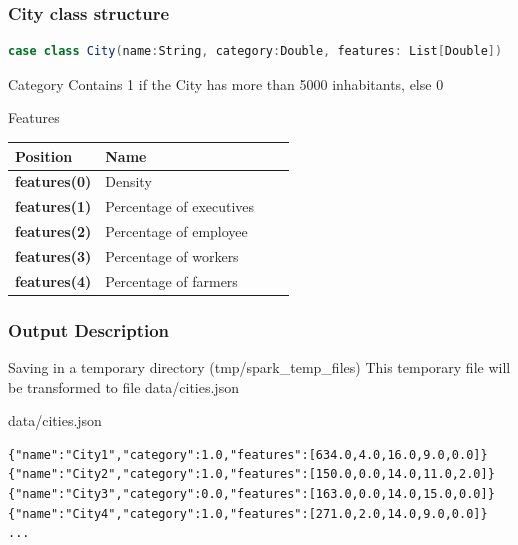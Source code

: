 \documentclass[slidetop,9pt,utf8]{beamer}
\begin{document}
\begin{CJK}{UTF8}{gbsn}
\begin{frame}[fragile]
  \frametitle{City class structure}

  \begin{lstlisting}[label=CityClassOverview, caption=psug.hands.on.exercise05.City class overview, language=scala, style=code]
case class City(name:String, category:Double, features: List[Double])
  \end{lstlisting}

  \begin{block}{Category}
    Contains 1 if the City has more than 5000 inhabitants, else 0
  \end{block}

  \begin{block}{Features}
    \begin{center}
      \begin{tabular}{|l|l|l|l|}
            \hline 
            \rowcolor{gray} \textbf{Position} & \textbf{Name} \\ \hline
            \textbf{features(0)} & Density \\ \hline
            \textbf{features(1)} & Percentage of executives \\ \hline
            \textbf{features(2)} & Percentage of employee \\ \hline
            \textbf{features(3)} & Percentage of workers \\ \hline
            \textbf{features(4)} & Percentage of farmers \\ \hline
      \end{tabular}
    \end{center}
  \end{block}

\end{frame}

\begin{frame}[fragile]

  \frametitle{Output Description}
  
  \begin{block}{Saving in a temporary directory (tmp/spark\_temp\_files)}
    This temporary file will be transformed to file data/cities.json
  \end{block}


  \begin{block}{data/cities.json}
    \begin{verbatim}
{"name":"City1","category":1.0,"features":[634.0,4.0,16.0,9.0,0.0]}
{"name":"City2","category":1.0,"features":[150.0,0.0,14.0,11.0,2.0]}
{"name":"City3","category":0.0,"features":[163.0,0.0,14.0,15.0,0.0]}
{"name":"City4","category":1.0,"features":[271.0,2.0,14.0,9.0,0.0]}
...
    \end{verbatim}
  \end{block}


\end{frame}
\end{CJK}
\end{document}
